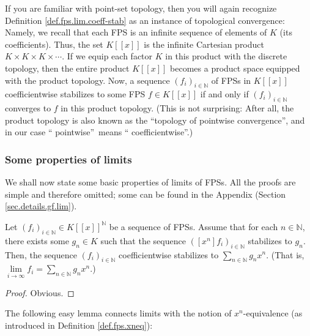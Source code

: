 \begin{remark}
If you are familiar with point-set topology, then you will again recognize
Definition \ref{def.fps.lim.coeff-stab} as an instance of topological
convergence: Namely, we recall that each FPS is an infinite sequence of
elements of $K$ (its coefficients). Thus, the set $K\left[  \left[  x\right]
\right]  $ is the infinite Cartesian product $K\times K\times K\times\cdots$.
If we equip each factor $K$ in this product with the discrete topology, then
the entire product $K\left[  \left[  x\right]  \right]  $ becomes a product
space equipped with the product topology. Now, a sequence $\left(
f_{i}\right)  _{i\in\mathbb{N}}$ of FPSs in $K\left[  \left[  x\right]
\right]  $ coefficientwise stabilizes to some FPS $f\in K\left[  \left[
x\right]  \right]  $ if and only if $\left(  f_{i}\right)  _{i\in\mathbb{N}}$
converges to $f$ in this product topology. (This is not surprising: After all,
the product topology is also known as the \textquotedblleft topology of
pointwise convergence\textquotedblright, and in our case \textquotedblleft
pointwise\textquotedblright\ means \textquotedblleft
coefficientwise\textquotedblright.)
\end{remark}

\subsubsection{Some properties of limits}

We shall now state some basic properties of limits of FPSs. All the proofs are
simple and therefore omitted; some can be found in the Appendix (Section
\ref{sec.details.gf.lim}).

\begin{theorem}
\label{thm.fps.lim.lim-crit}Let $\left(  f_{i}\right)  _{i\in\mathbb{N}}\in
K\left[  \left[  x\right]  \right]  ^{\mathbb{N}}$ be a sequence of FPSs.
Assume that for each $n\in\mathbb{N}$, there exists some $g_{n}\in K$ such
that the sequence $\left(  \left[  x^{n}\right]  f_{i}\right)  _{i\in
\mathbb{N}}$ stabilizes to $g_{n}$. Then, the sequence $\left(  f_{i}\right)
_{i\in\mathbb{N}}$ coefficientwise stabilizes to $\sum_{n\in\mathbb{N}}%
g_{n}x^{n}$. (That is, $\lim\limits_{i\rightarrow\infty}f_{i}=\sum
_{n\in\mathbb{N}}g_{n}x^{n}$.)
\end{theorem}

\begin{proof}
Obvious.
\end{proof}

The following easy lemma connects limits with the notion of $x^{n}%
$-equivalence (as introduced in Definition \ref{def.fps.xneq}):

